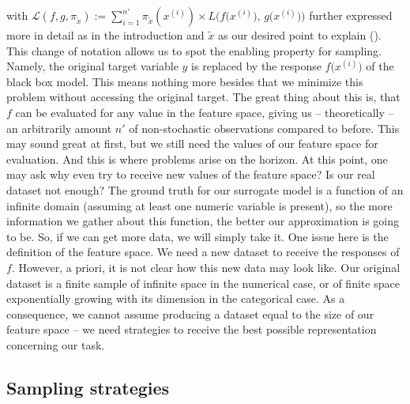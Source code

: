 \documentclass[]{krantz}
\begin{document}
with
\(\mathcal{L}\left(f, g, \pi_{\tilde x} \right) := \sum_{i=1}^{n'} \pi_{\tilde x}(x^{(i)}) \times L\Big( f\big(x^{(i)}\big), \, g\big(x^{(i)}\big) \Big)\)
further expressed more in detail as in the introduction and \(\tilde x\)
as our desired point to explain (\citet{LIMEformula}). This change of
notation allows us to spot the enabling property for sampling. Namely,
the original target variable \(y\) is replaced by the response
\(f\big(x^{(i)} \big)\) of the black box model. This means nothing more
besides that we minimize this problem without accessing the original
target. The great thing about this is, that \(f\) can be evaluated for
any value in the feature space, giving us -- theoretically -- an
arbitrarily amount \(n'\) of non-stochastic observations compared to
before. This may sound great at first, but we still need the values of
our feature space for evaluation. And this is where problems arise on
the horizon. At this point, one may ask why even try to receive new
values of the feature space? Is our real dataset not enough? The ground
truth for our surrogate model is a function of an infinite domain
(assuming at least one numeric variable is present), so the more
information we gather about this function, the better our approximation
is going to be. So, if we can get more data, we will simply take it. One
issue here is the definition of the feature space. We need a new dataset
to receive the responses of \(f\). However, a priori, it is not clear
how this new data may look like. Our original dataset is a finite sample
of infinite space in the numerical case, or of finite space
exponentially growing with its dimension in the categorical case. As a
consequence, we cannot assume producing a dataset equal to the size of
our feature space -- we need strategies to receive the best possible
representation concerning our task.

\subsection{Sampling strategies}\label{sampling-strategies}
\end{document}
